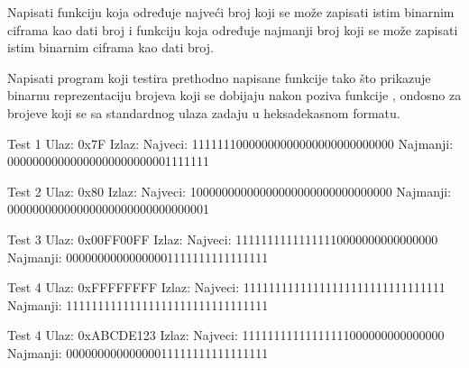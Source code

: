 \begin{Exercise}[label=203]
Napisati funkciju  koja određuje najveći broj koji se može zapisati istim binarnim ciframa kao dati broj i funkciju  koja određuje najmanji broj koji se može zapisati istim binarnim ciframa kao dati broj.

Napisati program koji testira prethodno napisane funkcije tako što prikazuje binarnu reprezentaciju brojeva koji se dobijaju nakon poziva funkcije , ondosno  za brojeve koji se sa standardnog ulaza zadaju u heksadekasnom formatu. 

\begin{maxitest}
\begin{test}{Test 1}
Ulaz:   0x7F  
Izlaz:  
 Najveci:
 11111110000000000000000000000000  
 Najmanji:
 00000000000000000000000001111111
\end{test}
\end{maxitest}

\begin{maxitest}
\begin{test}{Test 2}
Ulaz:   0x80
Izlaz:  
 Najveci:
 10000000000000000000000000000000  
 Najmanji:
 00000000000000000000000000000001
\end{test}
\end{maxitest}

\begin{maxitest}
\begin{test}{Test 3}
Ulaz:   0x00FF00FF
Izlaz:  
 Najveci:
 11111111111111110000000000000000  
 Najmanji:
 00000000000000001111111111111111
\end{test}
\end{maxitest}

\begin{maxitest}
\begin{test}{Test 4}
Ulaz:   0xFFFFFFFF
Izlaz:  
 Najveci:
 11111111111111111111111111111111   
 Najmanji:
 11111111111111111111111111111111
\end{test}
\end{maxitest}

\begin{maxitest}
\begin{test}{Test 4}
Ulaz:   0xABCDE123
Izlaz:  
 Najveci:
 11111111111111111000000000000000  
 Najmanji:
 00000000000000011111111111111111
\end{test}
\end{maxitest}

\end{Exercise}
\begin{Answer}[ref=203]
\end{Answer}


